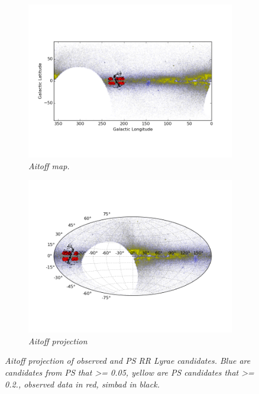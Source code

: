 \documentclass[aps,prl,twocolumn,superscriptaddress]{revtex4-1}
\begin{document}
\begin{figure}[h!]
	\centering
	\begin{subfigure}{.5\textwidth}
	  \centering
	  \includegraphics[width=1\linewidth]{figures/aitoff/simbad_alpha_is_1.png}
	  \caption{\it \small{Aitoff map.}}
	  \label{fig:aitoff_map_simbad}
	\end{subfigure}%
	\begin{subfigure}{.5\textwidth}
	  \centering
	  \includegraphics[width=1\linewidth]{figures/aitoff/Obs_PS_sim_lsum_aitoff_map.png}
	 \caption{\it \small{Aitoff projection}}%
	 \label{fig:aitoff_projection_simbad}
	\end{subfigure}
	\caption{\it \small{Aitoff projection of observed and PS RR Lyrae candidates.  Blue are candidates from PS that >= 0.05, yellow are PS candidates that >= 0.2., observed data in red, simbad in black.}}
	\label{fig:aitoff_simbad}
\end{figure}	
\end{document}
